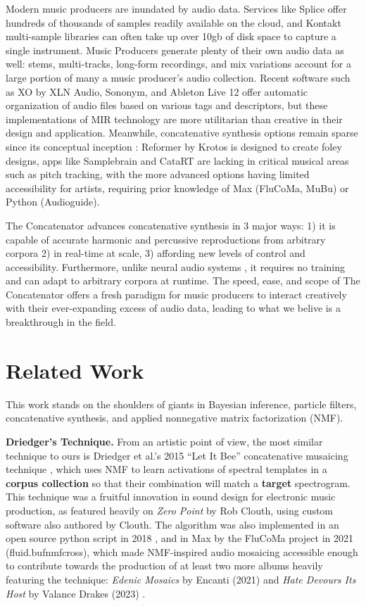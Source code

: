 \documentclass{article}
\begin{document}
Modern music producers are inundated by audio data. Services like Splice offer hundreds of thousands of samples readily available on the cloud, and Kontakt multi-sample libraries can often take up over 10gb of disk space to capture a single instrument. Music Producers generate plenty of their own audio data as well: stems, multi-tracks, long-form recordings, and mix variations account for a large portion of many a music producer's audio collection. Recent software such as XO by XLN Audio, Sononym, and Ableton Live 12 offer automatic organization of audio files based on various tags and descriptors, but these implementations of MIR technology are more utilitarian than creative in their design and application. Meanwhile, concatenative synthesis options remain sparse since its conceptual inception \cite{schwarz2000system}: Reformer by Krotos is designed to create foley designs, apps like Samplebrain and CataRT \cite{schwarz2006real, schwarz2008principles} are lacking in critical musical areas such as pitch tracking, with the more advanced options having limited accessibility for artists, requiring prior knowledge of Max (FluCoMa, MuBu) or Python (Audioguide).

The Concatenator advances concatenative synthesis in 3 major ways: 1) it is capable of accurate harmonic and percussive reproductions from arbitrary corpora 2) in real-time at scale, 3) affording new levels of control and accessibility.  Furthermore, unlike neural audio systems \cite{bitton2020neural}, it requires no training and can adapt to arbitrary corpora at runtime. The speed, ease, and scope of The Concatenator offers a fresh paradigm for music producers to interact creatively with their ever-expanding excess of audio data, leading to what we belive is a breakthrough in the field.

\section{Related Work}
\label{sec:relatedwork}
This work stands on the shoulders of giants in Bayesian inference, particle filters, concatenative synthesis, and applied nonnegative matrix factorization (NMF).

\textbf{Driedger's Technique.} From an artistic point of view, the most similar technique to ours is Driedger et al.'s 2015 ``Let It Bee'' concatenative musaicing technique \cite{driedger2015let}, which uses NMF to learn activations of spectral templates in a \textbf{corpus collection} so that their combination will match a \textbf{target} spectrogram. This technique was a fruitful innovation in sound design for electronic music production, as featured heavily on {\em Zero Point} by Rob Clouth\cite{clouth2020}, using custom software also authored by Clouth. The algorithm was also implemented in an open source python script in 2018 \cite{tralie2018}, and in Max by the FluCoMa project in 2021 (fluid.bufnmfcross)\cite{flucoma2021}, which made NMF-inspired audio mosaicing accessible enough to contribute towards the production of at least two more albums heavily featuring the technique: {\em Edenic Mosaics} by Encanti (2021) \cite{cantil2021} and {\em Hate Devours Its Host} by Valance Drakes (2023) \cite{drakes2023}.
\end{document}
